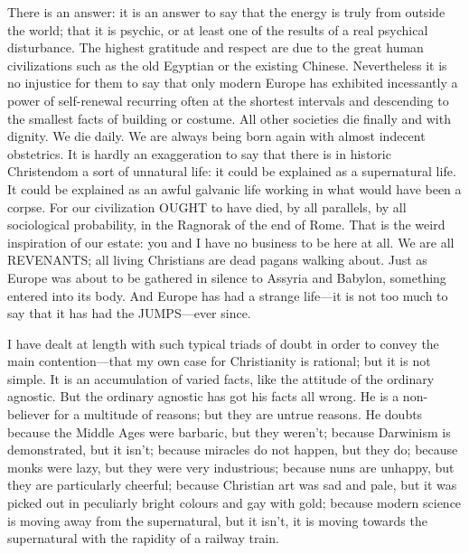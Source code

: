 There is an answer: it is an answer to say that the energy is truly from outside the world; that it is psychic, or at least one of the results of a real psychical disturbance. The highest gratitude and respect are due to the great human civilizations such as the old Egyptian or the existing Chinese. Nevertheless it is no injustice for them to say that only modern Europe has exhibited incessantly a power of self-renewal recurring often at the shortest intervals and descending to the smallest facts of building or costume. All other societies die finally and with dignity. We die daily. We are always being born again with almost indecent obstetrics. It is hardly an exaggeration to say that there is in historic Christendom a sort of unnatural life: it could be explained as a supernatural life. It could be explained as an awful galvanic life working in what would have been a corpse. For our civilization OUGHT to have died, by all parallels, by all sociological probability, in the Ragnorak of the end of Rome. That is the weird inspiration of our estate: you and I have no business to be here at all. We are all REVENANTS; all living Christians are dead pagans walking about. Just as Europe was about to be gathered in silence to Assyria and Babylon, something entered into its body. And Europe has had a strange life—it is not too much to say that it has had the JUMPS—ever since.

I have dealt at length with such typical triads of doubt in order to convey the main contention—that my own case for Christianity is rational; but it is not simple. It is an accumulation of varied facts, like the attitude of the ordinary agnostic. But the ordinary agnostic has got his facts all wrong. He is a non-believer for a multitude of reasons; but they are untrue reasons. He doubts because the Middle Ages were barbaric, but they weren’t; because Darwinism is demonstrated, but it isn’t; because miracles do not happen, but they do; because monks were lazy, but they were very industrious; because nuns are unhappy, but they are particularly cheerful; because Christian art was sad and pale, but it was picked out in peculiarly bright colours and gay with gold; because modern science is moving away from the supernatural, but it isn’t, it is moving towards the supernatural with the rapidity of a railway train.

